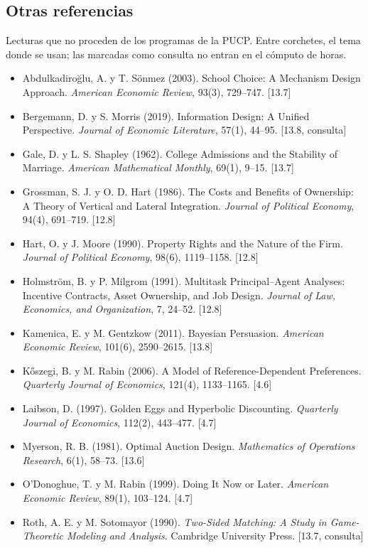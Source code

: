 \documentclass[11pt,a4paper]{article}
\begin{document}
\subsection*{Otras referencias}
Lecturas que no proceden de los programas de la PUCP. Entre corchetes, el tema
donde se usan; las marcadas como consulta no entran en el cómputo de horas.

\medskip
{\small
\begin{itemize}[leftmargin=1.4em,itemsep=1pt,label={}]
\item Abdulkadiroğlu, A. y T. Sönmez (2003). School Choice: A Mechanism Design Approach. \emph{American Economic Review}, 93(3), 729--747. [13.7]
\item Bergemann, D. y S. Morris (2019). Information Design: A Unified Perspective. \emph{Journal of Economic Literature}, 57(1), 44--95. [13.8, consulta]
\item Gale, D. y L. S. Shapley (1962). College Admissions and the Stability of Marriage. \emph{American Mathematical Monthly}, 69(1), 9--15. [13.7]
\item Grossman, S. J. y O. D. Hart (1986). The Costs and Benefits of Ownership: A Theory of Vertical and Lateral Integration. \emph{Journal of Political Economy}, 94(4), 691--719. [12.8]
\item Hart, O. y J. Moore (1990). Property Rights and the Nature of the Firm. \emph{Journal of Political Economy}, 98(6), 1119--1158. [12.8]
\item Holmström, B. y P. Milgrom (1991). Multitask Principal--Agent Analyses: Incentive Contracts, Asset Ownership, and Job Design. \emph{Journal of Law, Economics, and Organization}, 7, 24--52. [12.8]
\item Kamenica, E. y M. Gentzkow (2011). Bayesian Persuasion. \emph{American Economic Review}, 101(6), 2590--2615. [13.8]
\item Kőszegi, B. y M. Rabin (2006). A Model of Reference-Dependent Preferences. \emph{Quarterly Journal of Economics}, 121(4), 1133--1165. [4.6]
\item Laibson, D. (1997). Golden Eggs and Hyperbolic Discounting. \emph{Quarterly Journal of Economics}, 112(2), 443--477. [4.7]
\item Myerson, R. B. (1981). Optimal Auction Design. \emph{Mathematics of Operations Research}, 6(1), 58--73. [13.6]
\item O'Donoghue, T. y M. Rabin (1999). Doing It Now or Later. \emph{American Economic Review}, 89(1), 103--124. [4.7]
\item Roth, A. E. y M. Sotomayor (1990). \emph{Two-Sided Matching: A Study in Game-Theoretic Modeling and Analysis}. Cambridge University Press. [13.7, consulta]
\end{itemize}
}
\end{document}
